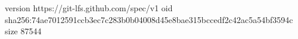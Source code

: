version https://git-lfs.github.com/spec/v1
oid sha256:74ae7012591ccb3ec7c283b0b04008d45e8bae315bccedf2c42ac5a54bf3594c
size 87544
